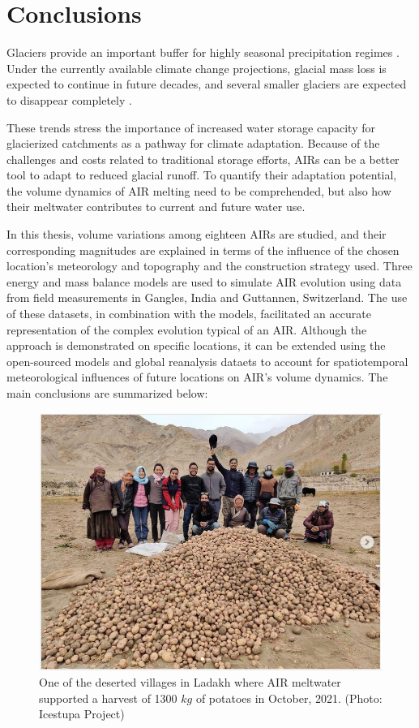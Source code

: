 \section{Conclusions}

Glaciers provide an important buffer for highly seasonal precipitation regimes
\citep{kaserContributionPotentialGlaciers2010}. Under the currently available climate change projections, glacial mass loss is expected to continue in future decades, and several smaller glaciers are expected to disappear completely \citep{rabatelCurrentStateGlaciers2013}.

These trends stress the importance of increased water storage capacity for glacierized catchments as a pathway
for climate adaptation. Because of the challenges and costs related to traditional storage efforts, \ac{AIRs} can
be a better tool to adapt to reduced glacial runoff. To quantify their adaptation potential, the volume dynamics of AIR melting need to be comprehended, but also how their meltwater contributes to
current and future water use. 

In this thesis, volume variations among eighteen \ac{AIRs} are studied, and their corresponding magnitudes
are explained in terms of the influence of the chosen location's meteorology and topography and the construction
strategy used. Three energy and mass balance models are used to simulate AIR evolution using data from field
measurements in Gangles, India and Guttannen, Switzerland. The use of these datasets, in combination with the
models, facilitated an accurate representation of the complex evolution typical of an AIR. Although the
approach is demonstrated on specific locations, it can be extended using the open-sourced models and global
reanalysis dataets to account for spatiotemporal meteorological influences of future locations on AIR's
volume dynamics. The main conclusions are summarized below:

\begin{figure}[htb]
  \centering
	\includegraphics[width=8 cm]{figs/Kullum_potatoes}
	\caption{One of the deserted villages in Ladakh where AIR meltwater supported a harvest of 1300 $kg$ of
		potatoes in October, 2021. (Photo: Icestupa Project)}
	\label{fig:kullum_potatoes}
\end{figure}

